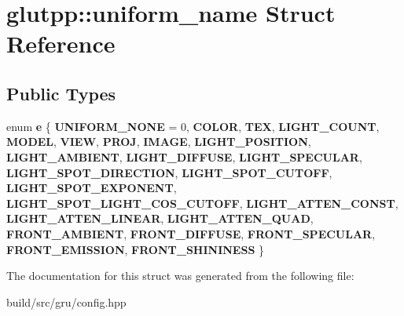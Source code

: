 \hypertarget{structglutpp_1_1uniform__name}{\section{glutpp\-:\-:uniform\-\_\-name \-Struct \-Reference}
\label{structglutpp_1_1uniform__name}
}
\subsection*{\-Public \-Types}
\begin{DoxyCompactItemize}
\item 
enum {\bfseries e} \{ \*
{\bfseries \-U\-N\-I\-F\-O\-R\-M\-\_\-\-N\-O\-N\-E} =  0, 
{\bfseries \-C\-O\-L\-O\-R}, 
{\bfseries \-T\-E\-X}, 
{\bfseries \-L\-I\-G\-H\-T\-\_\-\-C\-O\-U\-N\-T}, 
\*
{\bfseries \-M\-O\-D\-E\-L}, 
{\bfseries \-V\-I\-E\-W}, 
{\bfseries \-P\-R\-O\-J}, 
{\bfseries \-I\-M\-A\-G\-E}, 
\*
{\bfseries \-L\-I\-G\-H\-T\-\_\-\-P\-O\-S\-I\-T\-I\-O\-N}, 
{\bfseries \-L\-I\-G\-H\-T\-\_\-\-A\-M\-B\-I\-E\-N\-T}, 
{\bfseries \-L\-I\-G\-H\-T\-\_\-\-D\-I\-F\-F\-U\-S\-E}, 
{\bfseries \-L\-I\-G\-H\-T\-\_\-\-S\-P\-E\-C\-U\-L\-A\-R}, 
\*
{\bfseries \-L\-I\-G\-H\-T\-\_\-\-S\-P\-O\-T\-\_\-\-D\-I\-R\-E\-C\-T\-I\-O\-N}, 
{\bfseries \-L\-I\-G\-H\-T\-\_\-\-S\-P\-O\-T\-\_\-\-C\-U\-T\-O\-F\-F}, 
{\bfseries \-L\-I\-G\-H\-T\-\_\-\-S\-P\-O\-T\-\_\-\-E\-X\-P\-O\-N\-E\-N\-T}, 
{\bfseries \-L\-I\-G\-H\-T\-\_\-\-S\-P\-O\-T\-\_\-\-L\-I\-G\-H\-T\-\_\-\-C\-O\-S\-\_\-\-C\-U\-T\-O\-F\-F}, 
\*
{\bfseries \-L\-I\-G\-H\-T\-\_\-\-A\-T\-T\-E\-N\-\_\-\-C\-O\-N\-S\-T}, 
{\bfseries \-L\-I\-G\-H\-T\-\_\-\-A\-T\-T\-E\-N\-\_\-\-L\-I\-N\-E\-A\-R}, 
{\bfseries \-L\-I\-G\-H\-T\-\_\-\-A\-T\-T\-E\-N\-\_\-\-Q\-U\-A\-D}, 
{\bfseries \-F\-R\-O\-N\-T\-\_\-\-A\-M\-B\-I\-E\-N\-T}, 
\*
{\bfseries \-F\-R\-O\-N\-T\-\_\-\-D\-I\-F\-F\-U\-S\-E}, 
{\bfseries \-F\-R\-O\-N\-T\-\_\-\-S\-P\-E\-C\-U\-L\-A\-R}, 
{\bfseries \-F\-R\-O\-N\-T\-\_\-\-E\-M\-I\-S\-S\-I\-O\-N}, 
{\bfseries \-F\-R\-O\-N\-T\-\_\-\-S\-H\-I\-N\-I\-N\-E\-S\-S}
 \}
\end{DoxyCompactItemize}


\-The documentation for this struct was generated from the following file\-:\begin{DoxyCompactItemize}
\item 
build/src/gru/config.\-hpp\end{DoxyCompactItemize}
